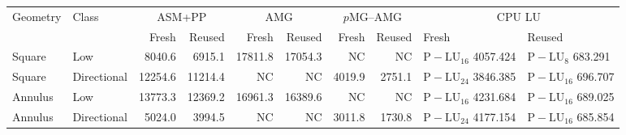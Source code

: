 \begin{tabular}{llrrrrrrll}
\toprule
Geometry & Class & \multicolumn{2}{c}{ASM+PP} & \multicolumn{2}{c}{AMG} & \multicolumn{2}{c}{$p$MG--AMG} & \multicolumn{2}{c}{CPU LU} \\
 & & Fresh & Reused & Fresh & Reused & Fresh & Reused & Fresh & Reused \\
\midrule
Square & Low & 8040.6 & 6915.1 & 17811.8 & 17054.3 & NC & NC & $\mathrm{P\!-\!LU}_{16}$ 4057.424 & $\mathrm{P\!-\!LU}_{8}$ 683.291 \\
Square & Directional & 12254.6 & 11214.4 & NC & NC & 4019.9 & 2751.1 & $\mathrm{P\!-\!LU}_{24}$ 3846.385 & $\mathrm{P\!-\!LU}_{16}$ 696.707 \\
\midrule
Annulus & Low & 13773.3 & 12369.2 & 16961.3 & 16389.6 & NC & NC & $\mathrm{P\!-\!LU}_{16}$ 4231.684 & $\mathrm{P\!-\!LU}_{16}$ 689.025 \\
Annulus & Directional & 5024.0 & 3994.5 & NC & NC & 3011.8 & 1730.8 & $\mathrm{P\!-\!LU}_{24}$ 4177.154 & $\mathrm{P\!-\!LU}_{16}$ 685.854 \\
\bottomrule
\end{tabular}
